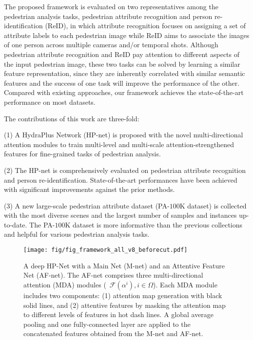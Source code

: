 \documentclass[10pt,twocolumn,letterpaper]{article}
\begin{document}
The proposed framework is evaluated on two representatives among the pedestrian analysis tasks, \ie pedestrian attribute recognition and person re-identification (ReID), in which attribute recognition focuses on assigning a set of attribute labels to each pedestrian image while ReID aims to associate the images of one person across multiple cameras and/or temporal shots.
Although pedestrian attribute recognition and ReID pay attention to different aspects of the input pedestrian image, these two tasks can be solved by learning a similar feature representation, since they are inherently correlated with similar semantic features and the success of one task will improve the performance of the other.
Compared with existing approaches, our framework achieves the state-of-the-art performance on most datasets.





The contributions of this work are three-fold:

(1) A HydraPlus Network (HP-net) is proposed with the novel multi-directional attention modules to train multi-level and multi-scale attention-strengthened features for fine-grained tasks of pedestrian analysis.


(2) The HP-net is comprehensively evaluated on pedestrian attribute recognition and person re-identification.
State-of-the-art performances have been achieved with significant improvements against the prior methods.

(3) A new large-scale pedestrian attribute dataset (PA-$100$K dataset) is collected with the most diverse scenes and the largest number of samples and instances up-to-date.
The PA-$100$K dataset is more informative than the previous collections and helpful for various pedestrian analysis tasks.







\begin{figure}[t]
\centering
\texttt{[image: fig/fig\_framework\_all\_v8\_beforecut.pdf]}
\caption{A deep HP-Net with a Main Net (M-net) and an Attentive Feature Net (AF-net). The AF-net comprises three multi-directional attention (MDA) modules (\ie~$\mathcal{F}(\alpha^i), i\in\Omega$). Each MDA module includes two components: (1) attention map generation with black solid lines, and (2) attentive features by masking the attention map to different levels of features in hot dash lines. A global average pooling and one fully-connected layer are applied to the concatenated features obtained from the M-net and AF-net.
}
\label{fig:framework}
\end{figure}
\end{document}
